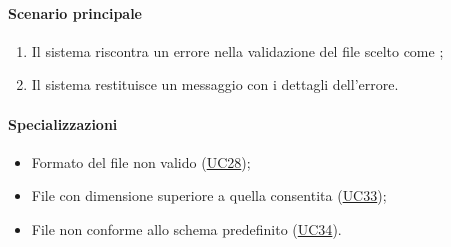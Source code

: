 \paragraph*{Scenario principale}
\begin{enumerate}
  \item Il sistema riscontra un errore nella validazione del file scelto come ;
  \item Il sistema restituisce un messaggio con i dettagli dell'errore. 
\end{enumerate}

\paragraph*{Specializzazioni}
\begin{itemize}
  \item Formato del file non valido (\hyperref[UC28]{UC28});
  \item File con dimensione superiore a quella consentita (\hyperref[UC33]{UC33});
  \item File non conforme allo schema predefinito (\hyperref[UC34]{UC34}).
\end{itemize}